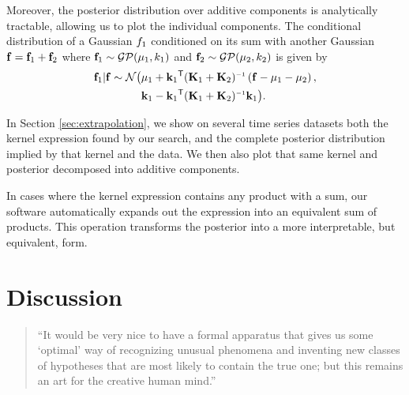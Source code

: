 \documentclass[twoside]{article}
\begin{document}
{Moreover, the posterior distribution over additive components is analytically tractable, allowing us to plot the individual components.
The conditional distribution of a Gaussian $f_1$ conditioned on its sum with another Gaussian ${\bf{f}} = {\bf{f}}_1 + {\bf{f}}_2$ where ${\bf{f}}_1 \sim \mathcal{GP}( {\bf{\mu}}_1, k_1)$ and ${\bf{f}}_2 \sim \mathcal{GP}( {\bf{\mu}}_2, k_2)$ is given by
\begin{align}
\vf_1 | \vf \sim \mathcal{N} \big( & \vmu_1 + \vk_1\tra (\vK_1 + \vK_2)\inv \left( \vf - \vmu_1 - \vmu_2 \right), \nonumber \\
& \vk_1 - \vk_1\tra (\vK_1 + \vK_2)\inv \vk_1 \big).
\end{align}

In Section \ref{sec:extrapolation}, we show on several time series datasets both the kernel expression found by our search, and the complete \gp{} posterior distribution implied by that kernel and the data.  
We then also plot that same kernel and posterior decomposed into additive components.

In cases where the kernel expression contains any product with a sum, our software automatically expands out the expression into an equivalent sum of products.  This operation transforms the posterior into a more interpretable, but equivalent, form.



\section{Discussion}

\begin{quotation}
``It would be very nice to have a formal apparatus that gives us some ‘optimal’ way of recognizing unusual phenomena and inventing new classes of hypotheses that are most likely to contain the true one; but this remains an art for the creative human mind.''


\end{quotation}}
\end{document}
